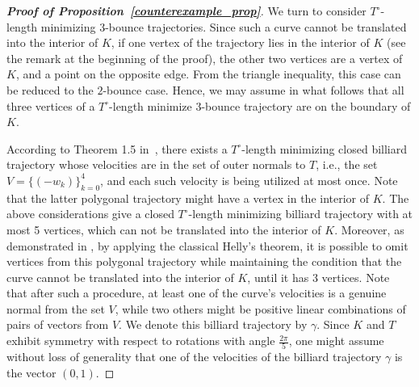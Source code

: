 \documentclass[10pt,a4paper]{article}
\theoremstyle{definition}
\begin{document}
\begin{proof}[{\bf Proof of Proposition~\ref{counterexample_prop}}]
\medskip 

We turn to consider $T^{\circ}$-length minimizing $3$-bounce trajectories.
Since such a curve cannot be translated into the interior of $K$, if one vertex of the trajectory lies in the interior of $K$ (see the remark at the beginning of the proof), the other two vertices are a vertex of $K$, and a point on the opposite edge. From the triangle inequality, this case can be reduced to the $2$-bounce case.
Hence, we may assume  in what follows that all three vertices of a $T^{\circ}$-length minimize $3$-bounce trajectory are on the boundary of $K$.



\medskip

According to Theorem 1.5 in~\cite{pazit}, there exists a $T^\circ$-length minimizing closed billiard trajectory whose velocities are in the set of outer normals to $T$, i.e., the set $V = \{(-w_k)\}_{k=0}^4$,
and each such velocity is being utilized at most once. Note that  the latter polygonal trajectory might have a vertex in the interior of $K$.
The above considerations give a closed $T^\circ$-length minimizing billiard trajectory with at most 5 vertices, which can not be translated into the interior of $K$. 
Moreover, as demonstrated in \cite[Lemma 2.1]{bezdek-bezdek}, by applying the classical Helly's theorem, it is possible to omit vertices from this polygonal trajectory while maintaining the condition that the curve cannot be translated into the interior of $K$, 
until it has  3 vertices. 
Note that after such a procedure,  at least one of the curve's velocities is a genuine normal from the set $V$, while two others might be positive linear combinations of pairs of vectors from $V$. We denote this billiard trajectory by $\gamma$.
Since $K$ and $T$ exhibit symmetry with respect to rotations with angle $\frac{2\pi}{5}$, one might assume without loss of generality that one of the velocities of the billiard trajectory  $\gamma$ is the vector $(0,1)$. 




\medskip 



\end{proof}
\end{document}
